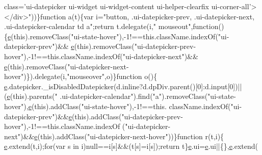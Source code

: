 \begin{DoxyCode}
{       class='ui-datepicker ui-widget ui-widget-content ui-helper-clearfix ui-corner-all'></div>"}))\}\textcolor{keyword}{function} a(t)\{var
       i=\textcolor{stringliteral}{"button, .ui-datepicker-prev, .ui-datepicker-next, .ui-datepicker-calendar td a"};\textcolor{keywordflow}{return} t.delegate(i,\textcolor{stringliteral}{"
      mouseout"},\textcolor{keyword}{function}()\{\hyperlink{jquery-ui_8min_8js_a2c038346d47955cbe2cb91e338edd7e1}{e}(\textcolor{keyword}{this}).removeClass(\textcolor{stringliteral}{"ui-state-hover"}),-1!==this.className.indexOf(\textcolor{stringliteral}{"ui-datepicker-prev"})&&
      \hyperlink{jquery-ui_8min_8js_a2c038346d47955cbe2cb91e338edd7e1}{e}(\textcolor{keyword}{this}).removeClass(\textcolor{stringliteral}{"ui-datepicker-prev-hover"}),-1!==this.className.indexOf(\textcolor{stringliteral}{"ui-datepicker-next"})&&
      \hyperlink{jquery-ui_8min_8js_a2c038346d47955cbe2cb91e338edd7e1}{e}(\textcolor{keyword}{this}).removeClass(\textcolor{stringliteral}{"ui-datepicker-next-hover"})\}).delegate(i,\textcolor{stringliteral}{"mouseover"},o)\}\textcolor{keyword}{function} o()\{
      \hyperlink{jquery-ui_8min_8js_a2c038346d47955cbe2cb91e338edd7e1}{e}.datepicker.\_isDisabledDatepicker(d.inline?d.dpDiv.parent()[0]:d.input[0])||(\hyperlink{jquery-ui_8min_8js_a2c038346d47955cbe2cb91e338edd7e1}{e}(\textcolor{keyword}{this}).parents(\textcolor{stringliteral}{"
      .ui-datepicker-calendar"}).find(\textcolor{stringliteral}{"a"}).removeClass(\textcolor{stringliteral}{"ui-state-hover"}),\hyperlink{jquery-ui_8min_8js_a2c038346d47955cbe2cb91e338edd7e1}{e}(\textcolor{keyword}{this}).addClass(\textcolor{stringliteral}{"ui-state-hover"}),-1!==this.
      className.indexOf(\textcolor{stringliteral}{"ui-datepicker-prev"})&&\hyperlink{jquery-ui_8min_8js_a2c038346d47955cbe2cb91e338edd7e1}{e}(\textcolor{keyword}{this}).addClass(\textcolor{stringliteral}{"ui-datepicker-prev-hover"}),-1!==this.className.indexOf
      (\textcolor{stringliteral}{"ui-datepicker-next"})&&\hyperlink{jquery-ui_8min_8js_a2c038346d47955cbe2cb91e338edd7e1}{e}(\textcolor{keyword}{this}).addClass(\textcolor{stringliteral}{"ui-datepicker-next-hover"}))\}\textcolor{keyword}{function} r(t,i)\{
      \hyperlink{jquery-ui_8min_8js_a2c038346d47955cbe2cb91e338edd7e1}{e}.extend(t,i);\textcolor{keywordflow}{for}(var s in i)null==i[s]&&(t[s]=i[s]);\textcolor{keywordflow}{return} t\}\hyperlink{jquery-ui_8min_8js_a2c038346d47955cbe2cb91e338edd7e1}{e}.ui=\hyperlink{jquery-ui_8min_8js_a2c038346d47955cbe2cb91e338edd7e1}{e}.ui||\{\},\hyperlink{jquery-ui_8min_8js_a2c038346d47955cbe2cb91e338edd7e1}{e}.extend(

\end{DoxyCode}
